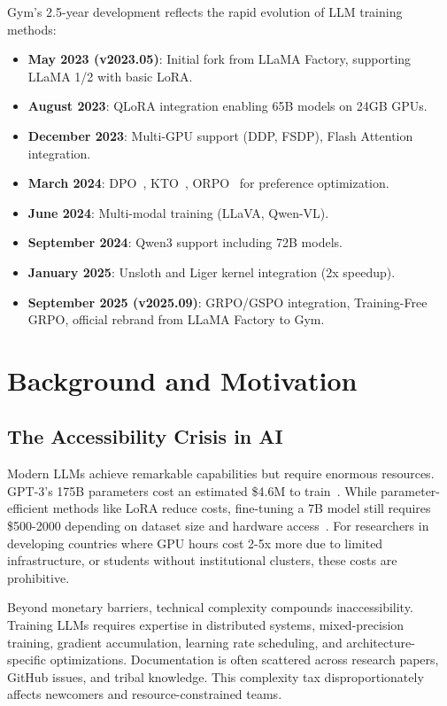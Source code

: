 \documentclass[11pt,letterpaper]{article}
\begin{document}
Gym's 2.5-year development reflects the rapid evolution of LLM training methods:

\begin{itemize}
\item \textbf{May 2023 (v2023.05)}: Initial fork from LLaMA Factory, supporting LLaMA 1/2 with basic LoRA.
\item \textbf{August 2023}: QLoRA integration enabling 65B models on 24GB GPUs.
\item \textbf{December 2023}: Multi-GPU support (DDP, FSDP), Flash Attention integration.
\item \textbf{March 2024}: DPO~\citep{rafailov2023dpo}, KTO~\citep{ethayarajh2024kto}, ORPO~\citep{hong2024orpo} for preference optimization.
\item \textbf{June 2024}: Multi-modal training (LLaVA, Qwen-VL).
\item \textbf{September 2024}: Qwen3 support including 72B models.
\item \textbf{January 2025}: Unsloth and Liger kernel integration (2x speedup).
\item \textbf{September 2025 (v2025.09)}: GRPO/GSPO integration, Training-Free GRPO, official rebrand from LLaMA Factory to Gym.
\end{itemize}

\section{Background and Motivation}

\subsection{The Accessibility Crisis in AI}

Modern LLMs achieve remarkable capabilities but require enormous resources. GPT-3's 175B parameters cost an estimated \$4.6M to train~\citep{brown2020gpt3}. While parameter-efficient methods like LoRA reduce costs, fine-tuning a 7B model still requires \$500-2000 depending on dataset size and hardware access~\citep{hu2021lora}. For researchers in developing countries where GPU hours cost 2-5x more due to limited infrastructure, or students without institutional clusters, these costs are prohibitive.

Beyond monetary barriers, technical complexity compounds inaccessibility. Training LLMs requires expertise in distributed systems, mixed-precision training, gradient accumulation, learning rate scheduling, and architecture-specific optimizations. Documentation is often scattered across research papers, GitHub issues, and tribal knowledge. This complexity tax disproportionately affects newcomers and resource-constrained teams.
\end{document}
